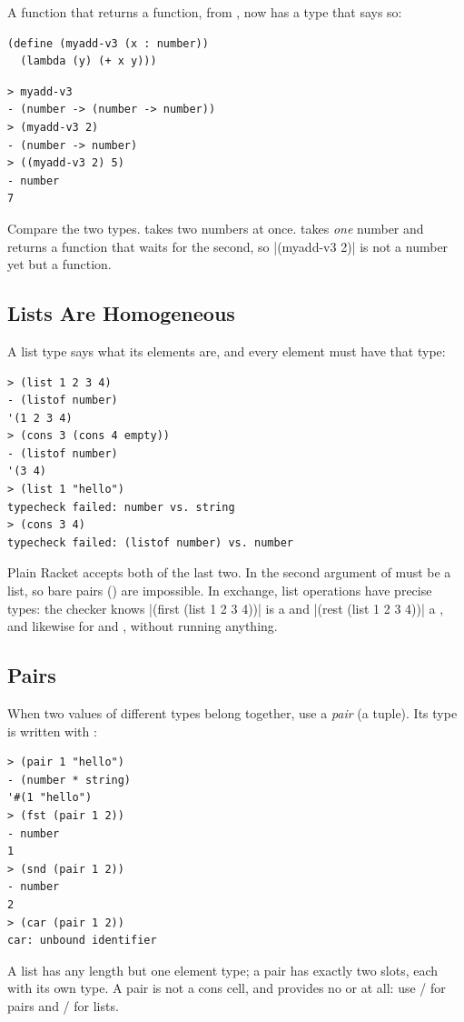 A function that returns a function,  from , now has a type that says so:
\begin{lstlisting}
(define (myadd-v3 (x : number))
  (lambda (y) (+ x y)))
\end{lstlisting}
\begin{lstlisting}[style=repl]
> myadd-v3
- (number -> (number -> number))
> (myadd-v3 2)
- (number -> number)
> ((myadd-v3 2) 5)
- number
7
\end{lstlisting}
Compare the two types.  takes two numbers at once.  takes \emph{one} number and returns a function that waits for the second, so \rkt|(myadd-v3 2)| is not a number yet but a function.

\subsection{Lists Are Homogeneous}

A list type says what its elements are, and every element must have that type:
\begin{lstlisting}[style=repl]
> (list 1 2 3 4)
- (listof number)
'(1 2 3 4)
> (cons 3 (cons 4 empty))
- (listof number)
'(3 4)
> (list 1 "hello")
typecheck failed: number vs. string
> (cons 3 4)
typecheck failed: (listof number) vs. number
\end{lstlisting}
Plain Racket accepts both of the last two. In  the second argument of  must be a list, so bare pairs () are impossible. In exchange, list operations have precise types: the checker knows \rkt|(first (list 1 2 3 4))| is a  and \rkt|(rest (list 1 2 3 4))| a , and likewise for  and , without running anything.

\subsection{Pairs}

When two values of different types belong together, use a \emph{pair} (a tuple). Its type is written with \code{*}:
\begin{lstlisting}[style=repl]
> (pair 1 "hello")
- (number * string)
'#(1 "hello")
> (fst (pair 1 2))
- number
1
> (snd (pair 1 2))
- number
2
> (car (pair 1 2))
car: unbound identifier
\end{lstlisting}
A list has any length but one element type; a pair has exactly two slots, each with its own type. A pair is not a cons cell, and  provides no  or  at all: use / for pairs and / for lists.

